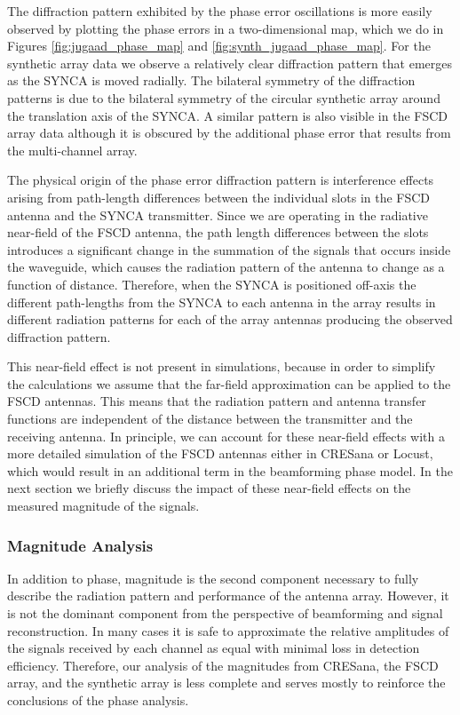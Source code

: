 The diffraction pattern exhibited by the phase error oscillations is more easily observed by plotting the phase errors in a two-dimensional map, which we do in Figures \ref{fig:jugaad_phase_map} and \ref{fig:synth_jugaad_phase_map}. For the synthetic array data we observe a relatively clear diffraction pattern that emerges as the SYNCA is moved radially. The bilateral symmetry of the diffraction patterns is due to the bilateral symmetry of the circular synthetic array around the translation axis of the SYNCA. A similar pattern is also visible in the FSCD array data although it is obscured by the additional phase error that results from the multi-channel array.

The physical origin of the phase error diffraction pattern is interference effects arising from path-length differences between the individual slots in the FSCD antenna and the SYNCA transmitter. Since we are operating in the radiative near-field of the FSCD antenna, the path length differences between the slots introduces a significant change in the summation of the signals that occurs inside the waveguide, which causes the radiation pattern of the antenna to change as a function of distance. Therefore, when the SYNCA is positioned off-axis the different path-lengths from the SYNCA to each antenna in the array results in different radiation patterns for each of the array antennas producing the observed diffraction pattern. 

This near-field effect is not present in simulations, because in order to simplify the calculations we assume that the far-field approximation can be applied to the FSCD antennas. This means that the radiation pattern and antenna transfer functions are independent of the distance between the transmitter and the receiving antenna. In principle, we can account for these near-field effects with a more detailed simulation of the FSCD antennas either in CRESana or Locust, which would result in an additional term in the beamforming phase model. In the next section we briefly discuss the impact of these near-field effects on the measured magnitude of the signals.

\subsubsection{Magnitude Analysis}

In addition to phase, magnitude is the second component necessary to fully describe the radiation pattern and performance of the antenna array. However, it is not the dominant component from the perspective of beamforming and signal reconstruction. In many cases it is safe to approximate the relative amplitudes of the signals received by each channel as equal with minimal loss in detection efficiency. Therefore, our analysis of the magnitudes from CRESana, the FSCD array, and the synthetic array is less complete and serves mostly to reinforce the conclusions of the phase analysis.

